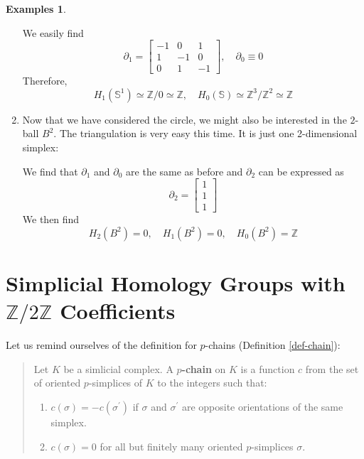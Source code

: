 \documentclass[draft,toc=bib]{scrartcl}
\theoremstyle{plain}
\theoremstyle{definition}
\newtheorem{examples}[theorem]{Examples}
\theoremstyle{remark}
\newcommand{\SH}{Simplicial Homology}
\newcommand{\Z}{\mathbb{Z}}
\newcommand{\Sp}{\mathbb{S}}
\begin{document}
\begin{examples}
\begin{enumerate}
We easily find 
\[
\partial_1=\begin{bmatrix}
-1&0&1\\1&-1&0\\0&1&-1
\end{bmatrix},\quad \partial_0\equiv 0
\]
Therefore,
\[H_1(\Sp^1)\simeq\Z/0\simeq\Z,\quad H_0(\Sp)\simeq\Z^3/\Z^2\simeq\Z
\]
\item 
Now that we have considered the circle, we might also be interested in the $2$-ball $B^2$. The triangulation is very easy this time. It is just one 2-dimensional simplex:
\begin{center}

We find that $\partial_1$ and $\partial_0$ are the same as before and $\partial_2$ can be expressed as
\[
\partial_2=\begin{bmatrix}
1\\1\\1
\end{bmatrix}
\]
We then find
\[
H_2(B^2)=0,\quad H_1(B^2)=0,\quad H_0(B^2)=\Z
\]

\end{center}
	\end{enumerate}
\end{examples}


\section{\SH{} Groups with $\mathbb{Z}/2\mathbb{Z}$ Coefficients}

Let us remind ourselves of the definition for $p$-chains (Definition \ref{def-chain}):
\begin{quotation}
	Let $K$ be a simlicial complex. A \textbf{$p$-chain} on $K$ is a function $c$ from the set of oriented $p$-simplices of $K$ to the integers such that:
	\begin{enumerate}
		\item $c(\sigma)=-c(\sigma^\prime)$ if $\sigma$ and $\sigma^\prime$ are opposite orientations of the same simplex.
		\item $c(\sigma)=0$ for all but finitely many oriented $p$-simplices $\sigma$.
	\end{enumerate}
\end{quotation}
\end{document}
